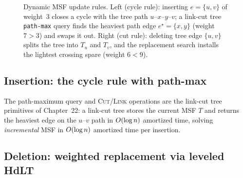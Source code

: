 \begin{figure}[htbp]
\caption{Dynamic MSF update rules. Left (cycle rule): inserting $e=\{u,v\}$ of weight~$3$ closes a cycle with the tree path $u\text{--}x\text{--}y\text{--}v$; a link-cut tree \texttt{path-max} query finds the heaviest path edge $e^\star=\{x,y\}$ (weight $7>3$) and swaps it out. Right (cut rule): deleting tree edge $\{u,v\}$ splits the tree into $T_u$ and $T_v$, and the replacement search installs the lightest crossing spare (weight $6 < 9$).}
\label{ch39:fig-dmst-rules}
\end{figure}

\subsection*{Insertion: the cycle rule with path-max}

\begin{algorithm}[H]
\caption{Dynamic MSF -- edge insertion}
\label{ch39:alg-dmst-ins}
\end{algorithm}

The path-maximum query and \textsc{Cut}/\textsc{Link} operations are the link-cut tree
primitives of Chapter~22: a link-cut tree stores the current MSF $T$ and returns the
heaviest edge on the $u$--$v$ path in $O(\log n)$ amortized time, solving
\emph{incremental} MSF in $O(\log n)$ amortized time per insertion.

\subsection*{Deletion: weighted replacement via leveled HdLT}

